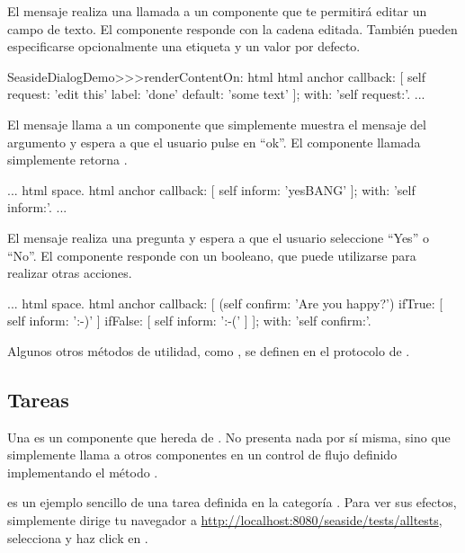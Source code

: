 \documentclass[a4paper,10pt,twoside]{book}
\begin{document}
El mensaje  realiza una llamada a un componente que te permitirá editar un campo de texto.
El componente responde con la cadena editada.
También pueden especificarse opcionalmente una etiqueta y un valor por defecto.

\begin{code}{}
SeasideDialogDemo>>>renderContentOn: html
	html anchor
		callback: [ self request: 'edit this' label: 'done' default: 'some text' ];
		with: 'self request:'.
...
\end{code}

El mensaje  llama a un componente que simplemente muestra el mensaje del argumento y espera a que el usuario pulse en ``ok''.
El componente llamada simplemente retorna .

\begin{code}{}
...
	html space.
	html anchor
		callback: [ self inform: 'yesBANG' ];
		with: 'self inform:'.
...
\end{code}

El mensaje  realiza una pregunta y espera a que el usuario seleccione ``Yes'' o ``No''.
El componente responde con un booleano, que puede utilizarse para realizar otras acciones.

\begin{code}{}
...
	html space.
	html anchor
		callback: [
			(self confirm: 'Are you happy?')
				ifTrue: [ self inform: ':-)' ]
				ifFalse: [ self inform: ':-(' ]
			];
		with: 'self confirm:'.
\end{code}

Algunos otros métodos de utilidad, como , se definen en el protocolo  de .

\subsection{Tareas}

Una  es un componente que hereda de .
No presenta nada por sí misma, sino que simplemente llama a otros componentes en un control de flujo definido implementando el método .

 es un ejemplo sencillo de una tarea definida en la categoría .
Para ver sus efectos, simplemente dirige tu navegador a \url{http://localhost:8080/seaside/tests/alltests}, selecciona  y haz click en .
\end{document}
